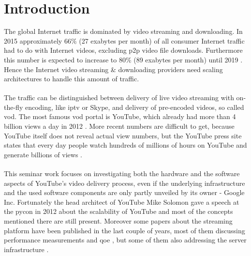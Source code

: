 \section{Introduction}

The global Internet traffic is dominated by video streaming and downloading. In 2015  approximately 66\% (27 exabytes per month) of all consumer Internet traffic had to do with Internet videos, excluding \gls{p2p} video file downloads. Furthermore this number is expected to increase to 80\% (89 exabytes per month) until 2019 \cite{misc:cisco}. Hence the Internet video streaming \& downloading providers  need scaling architectures to handle this amount of traffic.
\\
\\
The traffic can be distinguished between delivery of live video streaming with on-the-fly encoding, like \gls{iptv} or Skype, and delivery of pre-encoded videos, so called \gls{vod}. The most famous \gls{vod} portal is YouTube, which already had more than 4 billion views a day in 2012 \cite{misc:scalibility_at_youtube}. More recent numbers are difficult to get, because YouTube itself does not reveal actual view numbers, but the YouTube press site states that every day people watch hundreds of millions of hours on YouTube and generate billions of views \cite{misc:youtube_press}.
\\
\\
This seminar work focuses on investigating both the hardware and the software aspects of YouTube's video delivery process, even if the underlying infrastructure and the used software components are only partly unveiled by its owner - Google Inc. Fortunately the head architect of YouTube Mike Solomon gave a speech at the \gls{pycon} in 2012 about the scalability of YouTube \cite{misc:scalibility_at_youtube} and most of the concepts mentioned there are still present. Moreover some papers about the streaming platform have been published in the last couple of years, most of them discussing performance measurements \cite{inpr:vivisecting_youtube, inp:network_characteristics} and \gls{qoe} \cite{inc:video_delivery, inc:transport_protocols}, but some of them also addressing the server infrastructure \cite{inpr:server_selection, inpr:youtube_everywhere}.
